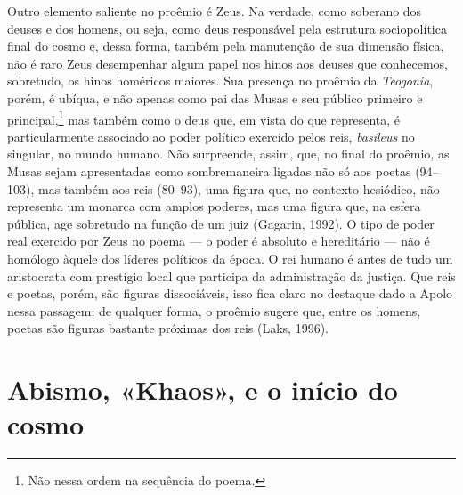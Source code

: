 Outro elemento saliente no proêmio é Zeus. Na verdade, como soberano dos
deuses e dos homens, ou seja, como deus responsável pela estrutura
sociopolítica final do cosmo e, dessa forma, também pela manutenção de
sua dimensão física, não é raro Zeus desempenhar algum papel nos hinos
aos deuses que conhecemos, sobretudo, os hinos homéricos maiores. Sua
presença no proêmio da \textit{Teogonia}, porém, é ubíqua, e não apenas
como pai das Musas e seu público primeiro e principal,\footnote{Não nessa ordem
na sequência do poema.} mas também como o deus que, em vista do que
representa, é particularmente associado ao poder político exercido pelos
reis, \textit{basileus} no singular, no mundo humano. Não surpreende,
assim, que, no final do proêmio, as Musas sejam apresentadas como
sombremaneira ligadas não só aos poetas (94--103), mas também aos reis
(80--93), uma figura que, no contexto hesiódico, não representa um
monarca com amplos poderes, mas uma figura que, na esfera pública, age
sobretudo na função de um juiz (Gagarin, 1992). O tipo de poder real
exercido por Zeus no poema --- o poder é absoluto e hereditário --- não é
homólogo àquele dos líderes políticos da época. O rei humano é antes de
tudo um aristocrata com prestígio local que participa da administração
da justiça. Que reis e poetas, porém, são figuras dissociáveis, isso
fica claro no destaque dado a Apolo nessa passagem; de qualquer forma, o
proêmio sugere que, entre os homens, poetas são figuras bastante
próximas dos reis (Laks, 1996).

\section{Abismo, «Khaos», e o início do cosmo}


